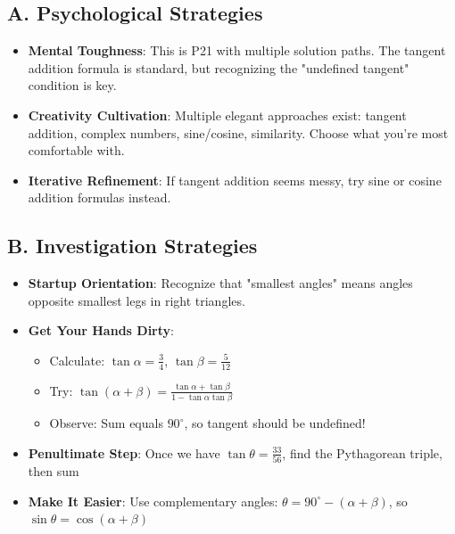 \documentclass[12pt]{article}
\begin{document}
\begin{strategicbox}
\subsection*{A. Psychological Strategies}
\begin{itemize}[leftmargin=*]
    \item \textbf{Mental Toughness}: This is P21 with multiple solution paths. The tangent addition formula is standard, but recognizing the "undefined tangent" condition is key.
    
    \item \textbf{Creativity Cultivation}: Multiple elegant approaches exist: tangent addition, complex numbers, sine/cosine, similarity. Choose what you're most comfortable with.
    
    \item \textbf{Iterative Refinement}: If tangent addition seems messy, try sine or cosine addition formulas instead.
\end{itemize}

\subsection*{B. Investigation Strategies}
\begin{itemize}[leftmargin=*]
    \item \textbf{Startup Orientation}: Recognize that "smallest angles" means angles opposite smallest legs in right triangles.
    
    \item \textbf{Get Your Hands Dirty}: 
    \begin{itemize}
        \item Calculate: $\tan\alpha = \frac{3}{4}$, $\tan\beta = \frac{5}{12}$
        \item Try: $\tan(\alpha + \beta) = \frac{\tan\alpha + \tan\beta}{1 - \tan\alpha \tan\beta}$
        \item Observe: Sum equals $90^{\circ}$, so tangent should be undefined!
    \end{itemize}
    
    \item \textbf{Penultimate Step}: Once we have $\tan\theta = \frac{33}{56}$, find the Pythagorean triple, then sum
    
    \item \textbf{Make It Easier}: Use complementary angles: $\theta = 90^{\circ} - (\alpha + \beta)$, so $\sin\theta = \cos(\alpha + \beta)$
    

\end{itemize}
\end{strategicbox}
\end{document}
